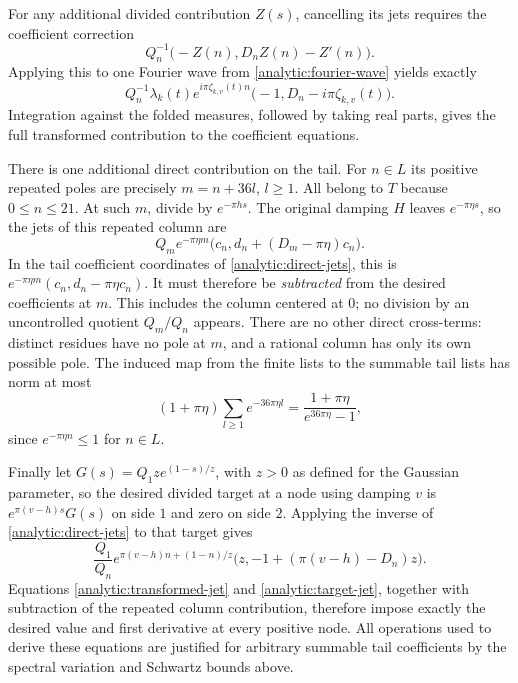 \documentclass[11pt]{article}
\theoremstyle{remark}\newtheorem{remark}[theorem]{Remark}
\begin{document}
For any additional divided contribution $Z(s)$, cancelling its jets
requires the coefficient correction
\[
 Q_n^{-1}\bigl(-Z(n),D_nZ(n)-Z'(n)\bigr).
\]
Applying this to one Fourier wave from
\eqref{analytic:fourier-wave} yields exactly
\begin{equation}\label{analytic:transformed-jet}
 Q_n^{-1}\lambda_k(t)e^{i\pi\zeta_{k,v}(t)n}
       \bigl(-1,D_n-i\pi\zeta_{k,v}(t)\bigr).
\end{equation}
Integration against the folded measures, followed by taking real
parts, gives the full transformed contribution to the coefficient
equations.

There is one additional direct contribution on the tail.
For $n\in L$ its positive repeated poles are precisely
$m=n+36l$, $l\ge1$.  All belong to $T$ because $0\le n\le21$.
At such $m$, divide by $e^{-\pi hs}$.  The original damping $H$
leaves $e^{-\pi\eta s}$, so the jets of this repeated column are
\[
 Q_m e^{-\pi\eta m}
     \bigl(c_n,d_n+(D_m-\pi\eta)c_n\bigr).
\]
In the tail coefficient coordinates of
\eqref{analytic:direct-jets}, this is
$e^{-\pi\eta m}(c_n,d_n-\pi\eta c_n)$.
It must therefore be \emph{subtracted} from the desired coefficients
at $m$.  This includes the column centered at $0$; no division by an
uncontrolled quotient $Q_m/Q_n$ appears.
There are no other direct cross-terms: distinct residues have no pole
at $m$, and a rational column has only its own possible pole.
The induced map from the finite lists to the summable tail lists has
norm at most
\begin{equation}\label{analytic:repetition-norm}
 (1+\pi\eta)\sum_{l\ge1}e^{-36\pi\eta l}
 =\frac{1+\pi\eta}{e^{36\pi\eta}-1},
\end{equation}
since $e^{-\pi\eta n}\le1$ for $n\in L$.

Finally let $G(s)=Q_1z e^{(1-s)/z}$, with $z>0$ as defined for the
Gaussian parameter, so the desired divided target at a node using
damping $v$ is $e^{\pi(v-h)s}G(s)$ on side $1$ and zero on side $2$.
Applying the inverse of \eqref{analytic:direct-jets} to that target
gives
\begin{equation}\label{analytic:target-jet}
 \frac{Q_1}{Q_n}e^{\pi(v-h)n+(1-n)/z}
    \bigl(z,-1+(\pi(v-h)-D_n)z\bigr).
\end{equation}
Equations \eqref{analytic:transformed-jet} and
\eqref{analytic:target-jet}, together with subtraction of the repeated
column contribution, therefore impose exactly the desired value and
first derivative at every positive node.  All operations used to
derive these equations are justified for arbitrary summable tail
coefficients by the spectral variation and Schwartz bounds above.
\end{document}
